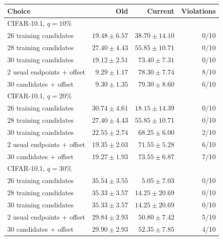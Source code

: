 \begin{tabular}{lrrr}
\toprule
Choice & Old & Current & Violations\\
\midrule
\multicolumn{4}{l}{CIFAR-10.1, $q=10\%$}\\
26 training candidates & $19.48\pm6.57$ & $38.70\pm14.10$ & 0/10\\
28 training candidates & $27.40\pm4.43$ & $55.85\pm10.71$ & 0/10\\
30 training candidates & $19.12\pm2.51$ & $73.40\pm7.31$ & 0/10\\
2 usual endpoints + offset & $9.29\pm1.17$ & $78.30\pm7.74$ & 8/10\\
30 candidates + offset & $9.30\pm1.35$ & $79.30\pm8.60$ & 6/10\\
\multicolumn{4}{l}{CIFAR-10.1, $q=20\%$}\\
26 training candidates & $30.74\pm4.61$ & $18.15\pm14.39$ & 0/10\\
28 training candidates & $27.40\pm4.43$ & $55.85\pm10.71$ & 0/10\\
30 training candidates & $22.55\pm2.74$ & $68.25\pm6.00$ & 2/10\\
2 usual endpoints + offset & $19.35\pm2.03$ & $71.55\pm5.28$ & 6/10\\
30 candidates + offset & $19.27\pm1.93$ & $73.55\pm6.87$ & 7/10\\
\multicolumn{4}{l}{CIFAR-10.1, $q=30\%$}\\
26 training candidates & $35.54\pm3.55$ & $5.05\pm7.03$ & 0/10\\
28 training candidates & $35.33\pm3.57$ & $14.25\pm20.69$ & 0/10\\
30 training candidates & $35.33\pm3.57$ & $14.25\pm20.69$ & 0/10\\
2 usual endpoints + offset & $29.84\pm2.93$ & $50.80\pm7.42$ & 5/10\\
30 candidates + offset & $29.90\pm2.93$ & $52.35\pm7.85$ & 4/10\\
\bottomrule
\end{tabular}
